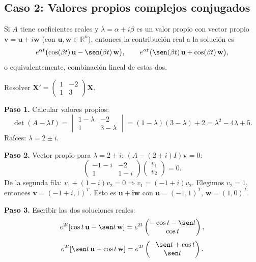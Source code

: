 \subsection{Caso 2: Valores propios complejos conjugados}

Si $A$ tiene coeficientes reales y $\lambda=\alpha+i\beta$ es un valor propio con vector propio $\mathbf{v}=\mathbf{u}+i\mathbf{w}$ (con $\mathbf{u},\mathbf{w}\in\mathbb{R}^n$), entonces la contribución real a la solución es
\[
e^{\alpha t}\bigl(\cos(\beta t)\,\mathbf{u}-\sen(\beta t)\,\mathbf{w}\bigr),\qquad
e^{\alpha t}\bigl(\sen(\beta t)\,\mathbf{u}+\cos(\beta t)\,\mathbf{w}\bigr),
\]
o equivalentemente, combinación lineal de estas dos.

\begin{example}
Resolver $\mathbf{X}'=
\begin{pmatrix}
1&-2\\
1&3
\end{pmatrix}\mathbf{X}$.
\begin{myproof}
\textbf{Paso 1.} Calcular valores propios:
\[
\det(A-\lambda I)=
\begin{vmatrix}
1-\lambda&-2\\
1&3-\lambda
\end{vmatrix}
=(1-\lambda)(3-\lambda)+2=\lambda^2-4\lambda+5.
\]
Raíces: $\lambda=2\pm i$.

\textbf{Paso 2.} Vector propio para $\lambda=2+i$:
$(A-(2+i)I)\mathbf{v}=0$:
\[
\begin{pmatrix}
-1-i&-2\\
1&1-i
\end{pmatrix}
\begin{pmatrix}
v_1\\v_2
\end{pmatrix}=0.
\]
De la segunda fila: $v_1+(1-i)v_2=0\Rightarrow v_1=(-1+i)v_2$. Elegimos $v_2=1$, entonces $\mathbf{v}=(-1+i,1)^T$. Esto es $\mathbf{u}+\mathbf{i}\mathbf{w}$ con $\mathbf{u}=(-1,1)^T$, $\mathbf{w}=(1,0)^T$.

\textbf{Paso 3.} Escribir las dos soluciones reales:
\[
e^{2t}[\cos t\,\mathbf{u}-\sen t\,\mathbf{w}]
= e^{2t}
\begin{pmatrix}
-\cos t-\sen t\\
\cos t
\end{pmatrix},
\]
\[
e^{2t}[\sen t\,\mathbf{u}+\cos t\,\mathbf{w}]
= e^{2t}
\begin{pmatrix}
-\sen t+\cos t\\
\sen t
\end{pmatrix}.
\]


\end{myproof}
\end{example}
